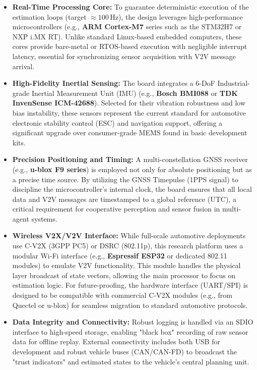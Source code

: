 \begin{itemize}
    \item \textbf{Real-Time Processing Core:}
    To guarantee deterministic execution of the estimation loops (target $\approx 100\,\mathrm{Hz}$), the design leverages high-performance microcontrollers (e.g., \textbf{ARM Cortex-M7} series such as the STM32H7 or NXP i.MX RT).
    Unlike standard Linux-based embedded computers, these cores provide bare-metal or RTOS-based execution with negligible interrupt latency, essential for synchronizing sensor acquisition with V2V message arrival.

    \item \textbf{High-Fidelity Inertial Sensing:}
    The board integrates a 6-DoF Industrial-grade Inertial Measurement Unit (IMU) (e.g., \textbf{Bosch BMI088} or \textbf{TDK InvenSense ICM-42688}).
    Selected for their vibration robustness and low bias instability, these sensors represent the current standard for automotive electronic stability control (ESC) and navigation support, offering a significant upgrade over consumer-grade MEMS found in basic development kits.

    \item \textbf{Precision Positioning and Timing:}
    A multi-constellation GNSS receiver (e.g., \textbf{u-blox F9 series}) is employed not only for absolute positioning but as a precise time source.
    By utilizing the GNSS Timepulse (1PPS signal) to discipline the microcontroller's internal clock, the board ensures that all local data and V2V messages are timestamped to a global reference (UTC), a critical requirement for cooperative perception and sensor fusion in multi-agent systems.

    \item \textbf{Wireless V2X/V2V Interface:}
    While full-scale automotive deployments use C-V2X (3GPP PC5) or DSRC (802.11p), this research platform uses a modular Wi-Fi interface (e.g., \textbf{Espressif ESP32} or dedicated 802.11 modules) to emulate V2V functionality.
    This module handles the physical layer broadcast of state vectors, allowing the main processor to focus on estimation logic.
    For future-proofing, the hardware interface (UART/SPI) is designed to be compatible with commercial C-V2X modules (e.g., from Quectel or u-blox) for seamless migration to standard automotive protocols.

    \item \textbf{Data Integrity and Connectivity:}
    Robust logging is handled via an SDIO interface to high-speed storage, enabling "black box" recording of raw sensor data for offline replay.
    External connectivity includes both USB for development and robust vehicle buses (CAN/CAN-FD) to broadcast the "trust indicators" and estimated states to the vehicle's central planning unit.
\end{itemize}

